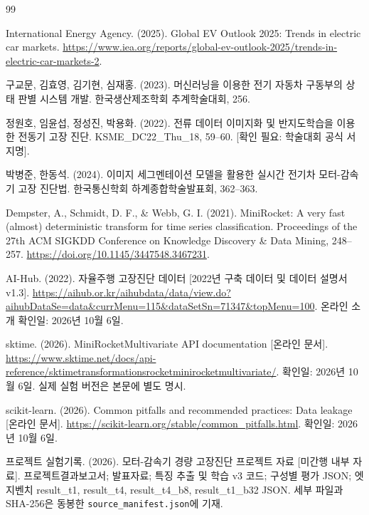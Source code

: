 \documentclass[11pt,a4paper]{article}
\newcommand{\checkneeded}[1]{\textcolor{red!65!black}{[확인 필요: #1]}}
\begin{document}
\begin{thebibliography}{99}
\raggedright
{}
International Energy Agency. (2025). Global EV Outlook 2025: Trends in electric car markets.
\url{https://www.iea.org/reports/global-ev-outlook-2025/trends-in-electric-car-markets-2}.

구교문, 김효영, 김기현, 심재홍. (2023). 머신러닝을 이용한 전기 자동차 구동부의 상태 판별 시스템 개발.
한국생산제조학회 추계학술대회, 256.

정원호, 임윤섭, 정성진, 박용화. (2022). 전류 데이터 이미지화 및 반지도학습을 이용한 전동기 고장 진단.
KSME\_DC22\_Thu\_18, 59--60. \checkneeded{학술대회 공식 서지명}.

박병준, 한동석. (2024). 이미지 세그멘테이션 모델을 활용한 실시간 전기차 모터-감속기 고장 진단법.
한국통신학회 하계종합학술발표회, 362--363.

Dempster, A., Schmidt, D. F., \& Webb, G. I. (2021).
MiniRocket: A very fast (almost) deterministic transform for time series classification.
Proceedings of the 27th ACM SIGKDD Conference on Knowledge Discovery \& Data Mining, 248--257.
\url{https://doi.org/10.1145/3447548.3467231}.

AI-Hub. (2022). 자율주행 고장진단 데이터 [2022년 구축 데이터 및 데이터 설명서 v1.3].
\url{https://aihub.or.kr/aihubdata/data/view.do?aihubDataSe=data&currMenu=115&dataSetSn=71347&topMenu=100}.
온라인 소개 확인일: 2026년 10월 6일.

sktime. (2026). MiniRocketMultivariate API documentation [온라인 문서].
\url{https://www.sktime.net/docs/api-reference/sktimetransformationsrocketminirocketmultivariate/}.
확인일: 2026년 10월 6일. 실제 실험 버전은 본문에 별도 명시.

scikit-learn. (2026). Common pitfalls and recommended practices: Data leakage [온라인 문서].
\url{https://scikit-learn.org/stable/common_pitfalls.html}.
확인일: 2026년 10월 6일.

프로젝트 실험기록. (2026). 모터-감속기 경량 고장진단 프로젝트 자료 [미간행 내부 자료].
프로젝트결과보고서; 발표자료; 특징 추출 및 학습 v3 코드; 구성별 평가 JSON;
엣지벤치 result\_t1, result\_t4, result\_t4\_b8, result\_t1\_b32 JSON.
세부 파일과 SHA-256은 동봉한 \texttt{source\_manifest.json}에 기재.
\end{thebibliography}
\end{document}
